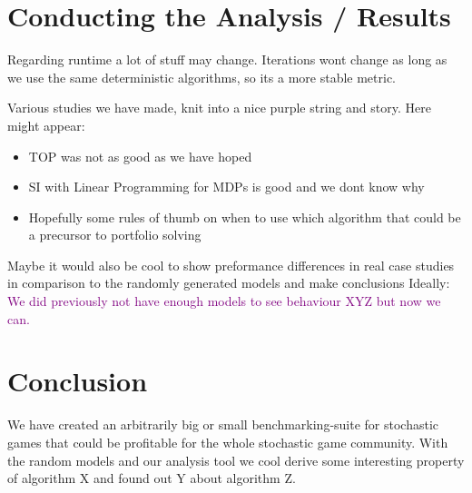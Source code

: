 \chapter{Conducting the Analysis / Results}
Regarding runtime a lot of stuff may change. Iterations wont change as long as we use the same deterministic algorithms, so its a more stable metric.

Various studies we have made, knit into a nice purple string and story. Here might appear:
\begin{itemize}
\item TOP was not as good as we have hoped
\item SI with Linear Programming for MDPs is good and we dont know why
\item Hopefully some rules of thumb on when to use which algorithm that could be a precursor to portfolio solving
\end{itemize}

Maybe it would also be cool to show preformance differences in real case studies in comparison to the randomly generated models and make conclusions Ideally: \textcolor{purple}{We did previously not have enough models to see behaviour XYZ but now we can.}

\chapter{Conclusion}
We have created an arbitrarily big or small benchmarking-suite for stochastic games that could be profitable for the whole stochastic game community. With the random models and our analysis tool we cool derive some interesting property of algorithm X and found out Y about algorithm Z.